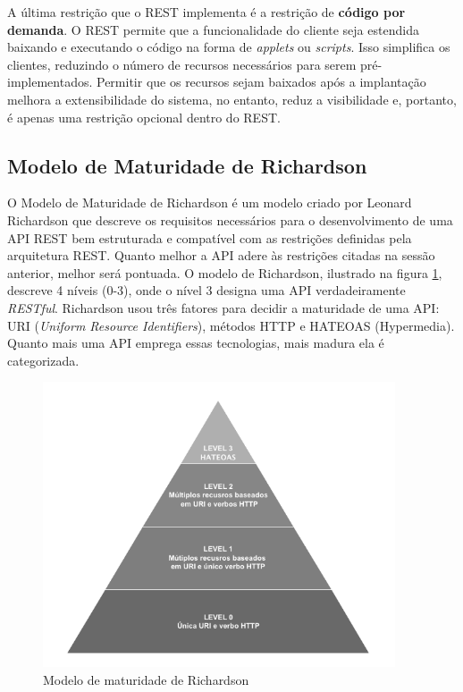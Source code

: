 A última restrição que o REST implementa é a restrição de \textbf{código por demanda}. O REST permite que a funcionalidade do cliente seja estendida baixando e executando o código na forma de \textit{applets} ou \textit{scripts}. Isso simplifica os clientes, reduzindo o número de recursos necessários para serem pré-implementados. Permitir que os recursos sejam baixados após a implantação melhora a extensibilidade do sistema, no entanto, reduz a visibilidade e, portanto, é apenas uma restrição opcional dentro do REST.

\subsection{Modelo de Maturidade de Richardson}

O Modelo de Maturidade de Richardson é um modelo criado por Leonard Richardson que descreve os requisitos necessários para o desenvolvimento de uma API REST bem estruturada e compatível com as restrições definidas pela arquitetura REST. Quanto melhor a API adere às restrições citadas na sessão anterior, melhor será pontuada. O modelo de Richardson, ilustrado na figura \ref{fig:rest-maturity-model}, descreve 4 níveis (0-3), onde o nível 3 designa uma API verdadeiramente \textit{RESTful}. Richardson usou três fatores para decidir a maturidade de uma API: URI (\textit{Uniform Resource Identifiers}), métodos HTTP e HATEOAS (Hypermedia). Quanto mais uma API emprega essas tecnologias, mais madura ela é categorizada.

\begin{figure}[htbp]
\centering
\includegraphics[width=0.93\textwidth]{figuras/modelo-maturidade.png}
\caption{Modelo de maturidade de Richardson}
\label{fig:rest-maturity-model}
\end{figure}

